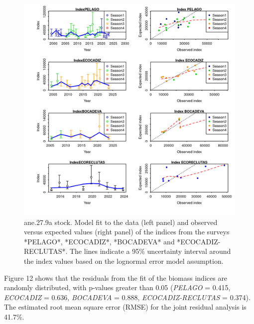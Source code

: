 \documentclass[
]{article}
\begin{document}
\begin{figure}[H]

{\centering \includegraphics[width=0.95\linewidth]{report/run/S1.0_4FLEETS/fig_indices_fit} 

}

\caption{ane.27.9a stock. Model fit to the data (left panel) and observed versus expected values (right panel) of the indices from the surveys *PELAGO*, *ECOCADIZ*, *BOCADEVA* and *ECOCADIZ-RECLUTAS*. The lines indicate a 95\% uncertainty interval around the index values based on the lognormal error model assumption. }\label{fig:unnamed-chunk-14}
\end{figure}

Figure 12 shows that the residuals from the fit of the biomass indices
are randomly distributed, with p-values greater than 0.05 (\emph{PELAGO}
= 0.415, \emph{ECOCADIZ} = 0.636, \emph{BOCADEVA} = 0.888,
\emph{ECOCADIZ-RECLUTAS} = 0.374). The estimated root mean square error
(RMSE) for the joint residual analysis is 41.7\%.
\end{document}

